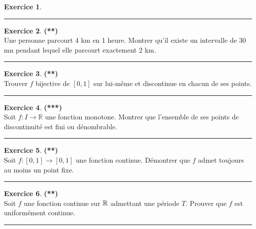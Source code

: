 \documentclass[a4paper,11pt]{article}
\theoremstyle{definition}
\newtheorem{exo}{Exercice} %
\begin{document}
\begin{minipage}[t]{1\linewidth}
\begin{minipage}[t]{0.48\linewidth}
\begin{exo}
	\centering
	\rule{1\linewidth}{0.6pt}
\end{exo}

	\begin{exo}\textbf{(**)}\quad\\[0.2cm]
		Une personne parcourt 4 km en 1 heure.
		Montrer qu'il existe un intervalle de 30 mn pendant lequel elle parcourt exactement 2 km.
		
			\centering
		\rule{1\linewidth}{0.6pt}
		\end{exo}
	
	
		\begin{exo}\textbf{(**)}\quad\\[0.2cm]
		Trouver $f$  bijective de $[0,1]$ sur lui-même et discontinue en chacun de ses points.
		
		\centering
		\rule{1\linewidth}{0.6pt}
	\end{exo}

	\begin{exo}\textbf{(***)}\quad\\[0.2cm]%
	Soit $f:I\to\mathbb R$ une fonction monotone. Montrer que l'ensemble de ses points de discontinuité est fini ou dénombrable.
	
	\centering
	\rule{1\linewidth}{0.6pt}
\end{exo}

	
		
	\end{minipage}	
	\hfill\vrule\hfill
	\begin{minipage}[t]{0.48\linewidth}
		\raggedright
		

			\begin{exo}\textbf{(**)}\quad\\[0.2cm]
			Soit $f:[0,1]\to[0,1]$ une fonction continue. Démontrer que $f$ admet toujours au moins un point fixe.
			
			\centering
			\rule{1\linewidth}{0.6pt}
		\end{exo}
		
		
		\begin{exo}\textbf{(**)}\quad\\[0.2cm]
			Soit $f$ une fonction continue sur $\mathbb{R}$ admettant une période $T$. Prouver que $f$ est uniformément continue.
			
			\centering
			\rule{1\linewidth}{0.6pt}
		\end{exo}
		


\end{minipage}
\end{minipage}
\end{document}
